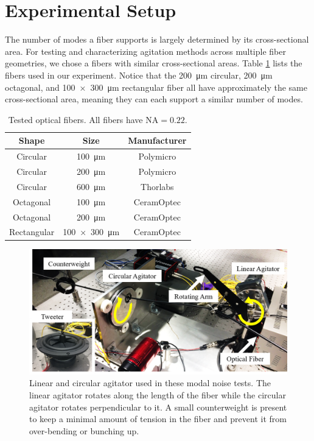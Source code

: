 \documentclass[twocolumn]{emulateapj}
\begin{document}
\section{Experimental Setup}
\label{sec:experimental_setup}

The number of modes a fiber supports is largely determined by its cross-sectional area. For testing and characterizing agitation methods across multiple fiber geometries, we chose a fibers with similar cross-sectional areas. Table \ref{table:fibers} lists the fibers used in our experiment. Notice that the \SI{200}{\micro\meter} circular, \SI{200}{\micro\meter} octagonal, and \SI{100x300}{\micro\meter} rectangular fiber all have approximately the same cross-sectional area, meaning they can each support a similar number of modes.

\begin{table}
\centering
\caption{Tested optical fibers. All fibers have $\mathrm{NA} = 0.22$.}
	\begin{tabular}{ccc}
	\hline
	Shape & Size & Manufacturer \\
	\hline
	\hline
	Circular & \SI{100}{\micro\meter} & Polymicro \\
	Circular & \SI{200}{\micro\meter} & Polymicro \\
	Circular & \SI{600}{\micro\meter} & Thorlabs \\
	Octagonal & \SI{100}{\micro\meter} & CeramOptec \\
	Octagonal & \SI{200}{\micro\meter} & CeramOptec \\
	Rectangular & \SI{100x300}{\micro\meter} & CeramOptec \\
	\hline
	\end{tabular}
\label{table:fibers}
\end{table}

\begin{figure}
\centering
	\includegraphics[width=\columnwidth]{images/agitators_labelled.png}
	\caption{Linear and circular agitator used in these modal noise tests. The linear agitator rotates along the length of the fiber while the circular agitator rotates perpendicular to it. A small counterweight is present to keep a minimal amount of tension in the fiber and prevent it  from over-bending or bunching up.}
\label{fig:agitators}
\end{figure}
\end{document}
